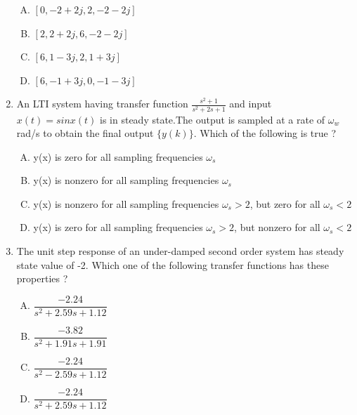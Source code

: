 \documentclass[journal,12pt,twocolumn]{IEEEtran}
\begin{document}
\begin{enumerate}
\begin{enumerate}[(A)]
\setlength\itemsep{2em}

\item $[0,-2+2j,2,-2-2j]$
\item $[2,2+2j,6,-2-2j]$
\item $[6,1-3j,2,1+3j]$
\item $[6,-1+3j,0,-1-3j]$

\end{enumerate}

\item An LTI system having transfer function $\frac{s^{2}+1}{s^{2}+2s+1}$ and input $x(t)=sinx(t)$ is in steady state.The output is sampled at a rate of $\omega_w$ rad/s to obtain the final output $\{y(k)\}$. Which of the following is true ?\\

\begin{enumerate}[(A)]

\setlength\itemsep{2em}

\item y(x) is zero for all sampling frequencies $\omega_s$
\item y(x) is nonzero for all sampling frequencies $\omega_s$
\item y(x) is nonzero for all sampling frequencies $\omega_s>2$, but zero for all $\omega_s<2$
\item y(x) is zero for all sampling frequencies $\omega_s>2$, but nonzero for all $\omega_s<2$

\end{enumerate}

\item The unit step response of an under-damped second order system has steady state value of -2. Which one of the following transfer functions has these properties ?\\


\begin{enumerate}[(A)]

\setlength\itemsep{2em}

\item $\dfrac{-2.24}{s^{2}+2.59s+1.12}$
\item $\dfrac{-3.82}{s^{2}+1.91s+1.91}$
\item $\dfrac{-2.24}{s^{2}-2.59s+1.12}$
\item $\dfrac{-2.24}{s^{2}+2.59s+1.12}$


\end{enumerate}
\end{enumerate}
\end{document}

